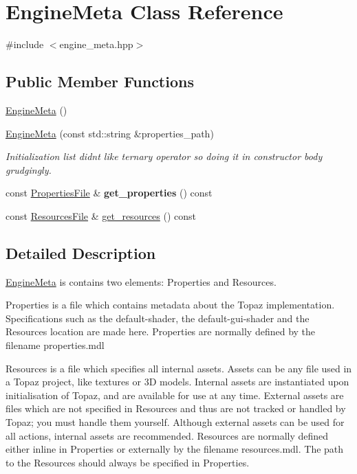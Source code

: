 \hypertarget{class_engine_meta}{}\section{Engine\+Meta Class Reference}
\label{class_engine_meta}


{\ttfamily \#include $<$engine\+\_\+meta.\+hpp$>$}

\subsection*{Public Member Functions}
\begin{DoxyCompactItemize}
\item 
\mbox{\hyperlink{class_engine_meta_acd384c252773279afc79cfa535d6487c}{Engine\+Meta}} ()
\item 
\mbox{\hyperlink{class_engine_meta_aead57aabdb172dd359bd34dc99c1c37e}{Engine\+Meta}} (const std\+::string \&properties\+\_\+path)
\begin{DoxyCompactList}\small\item\em Initialization list didn\textquotesingle{}t like ternary operator so doing it in constructor body grudgingly. \end{DoxyCompactList}\item 
\mbox{\label{class_engine_meta_ac1cf6856bb63a162c2284e842eaa6d9e}} 
const \mbox{\hyperlink{class_properties_file}{Properties\+File}} \& {\bfseries get\+\_\+properties} () const
\item 
const \mbox{\hyperlink{class_resources_file}{Resources\+File}} \& \mbox{\hyperlink{class_engine_meta_a3834c2a1d2fb9a957ac856dd50f33cd4}{get\+\_\+resources}} () const
\end{DoxyCompactItemize}


\subsection{Detailed Description}
\mbox{\hyperlink{class_engine_meta}{Engine\+Meta}} is contains two elements\+: Properties and Resources.

Properties is a file which contains metadata about the Topaz implementation. Specifications such as the default-\/shader, the default-\/gui-\/shader and the Resources location are made here. Properties are normally defined by the filename \textquotesingle{}properties.\+mdl\textquotesingle{}

Resources is a file which specifies all internal assets. Assets can be any file used in a Topaz project, like textures or 3D models. Internal assets are instantiated upon initialisation of Topaz, and are available for use at any time. External assets are files which are not specified in Resources and thus are not tracked or handled by Topaz; you must handle them yourself. Although external assets can be used for all actions, internal assets are recommended. Resources are normally defined either inline in Properties or externally by the filename \textquotesingle{}resources.\+mdl\textquotesingle{}. The path to the Resources should always be specified in Properties.

